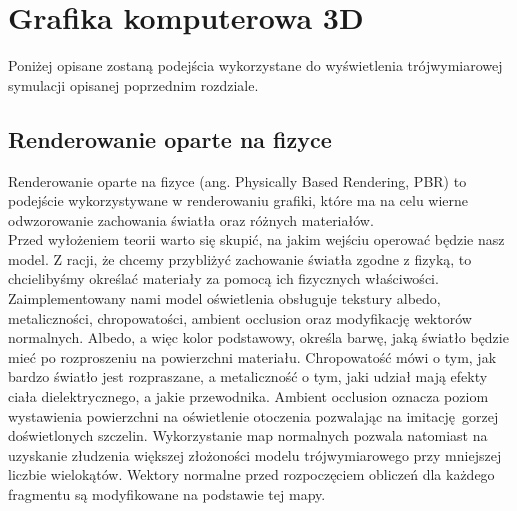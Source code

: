 \section{Grafika komputerowa 3D}

Poniżej opisane zostaną podejścia wykorzystane do wyświetlenia trójwymiarowej symulacji opisanej poprzednim rozdziale.

\subsection{Renderowanie oparte na fizyce}

Renderowanie oparte na fizyce (ang. Physically Based Rendering, PBR) to podejście wykorzystywane w renderowaniu grafiki, które ma na celu wierne odwzorowanie zachowania światła oraz różnych materiałów.
\\

Przed wyłożeniem teorii warto się skupić, na jakim wejściu operować będzie nasz model. Z racji, że chcemy przybliżyć zachowanie światła zgodne z fizyką, to chcielibyśmy określać materiały za pomocą ich fizycznych właściwości. Zaimplementowany nami model oświetlenia obsługuje tekstury albedo, metaliczności, chropowatości, ambient occlusion oraz modyfikację wektorów normalnych.
Albedo, a więc kolor podstawowy, określa barwę, jaką światło będzie mieć po rozproszeniu na powierzchni materiału. Chropowatość mówi o tym, jak bardzo światło jest rozpraszane, a  metaliczność o tym, jaki udział mają efekty ciała dielektrycznego, a jakie przewodnika. Ambient occlusion oznacza poziom wystawienia powierzchni na oświetlenie otoczenia pozwalając na imitację gorzej doświetlonych szczelin. Wykorzystanie map normalnych pozwala natomiast na uzyskanie złudzenia większej złożoności modelu trójwymiarowego przy mniejszej liczbie wielokątów. Wektory normalne przed rozpoczęciem obliczeń dla każdego fragmentu są modyfikowane na podstawie tej mapy.
\\

